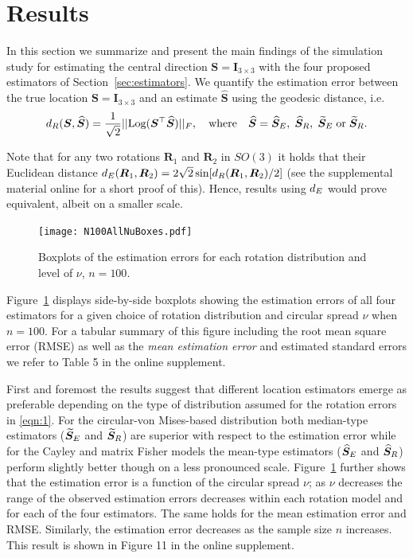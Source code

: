 \section{Results}\label{sec:results}

In this section we summarize and present the main findings of the simulation study for  estimating the central direction $\bm S = \bm I_{3\times 3}$ with the four proposed estimators of Section~\ref{sec:estimators}. We quantify the estimation error between the true location $\bm S = \bm I_{3\times 3}$ and an estimate $\widehat{\bm S}$ using the geodesic distance, i.e.
\begin{equation}
{d_R}(\bm{S}, \widehat{\bm{S}}) =  \frac{1}{\sqrt{2}}||
\text{Log}(\bm{S}^\top\widehat{\bm{S}})||_F, \quad \mbox{where} \quad \widehat{\bm{S}} =  {\widehat{\bm S}_E}, \; {\widehat{\bm S}_R},\;  {\widetilde{\bm S}_E} \; \mbox{or} \; {\widetilde{\bm S}_R}.
\end{equation}

Note that for any two rotations $\bm R_1$ and $\bm R_2$ in $SO(3)$ it holds that their Euclidean distance ${d_E}(\bm R_1,\bm R_2)=2\sqrt{2}\sin[{d_R}(\bm R_1,\bm R_2)/2]$ (see the supplemental material online for a short proof of this).  Hence, results using ${d_E}$ would prove equivalent, albeit on a smaller scale.   
\begin{figure}[h!]
\centering
\texttt{[image: N100AllNuBoxes.pdf]}
\caption{Boxplots of the estimation errors for each rotation distribution and level of $\nu$,  $n=100$.}
\label{fig:NuBoxes}
\end{figure}
Figure~\ref{fig:NuBoxes} displays side-by-side boxplots showing the estimation errors of all four estimators for a given choice of rotation distribution and circular spread $\nu$ when  $n=100$.   For a tabular summary of this figure including the root mean square error (RMSE)  as well as the \textit{mean estimation error} and estimated standard errors we refer to Table 5 in the online supplement. 

First and foremost the results suggest that different location estimators emerge as preferable depending on the type of distribution assumed for the rotation errors in \eqref{eqn:1}.  For the circular-von Mises-based distribution both median-type estimators (${\widetilde{\bm S}_E}$ and ${\widetilde{\bm S}_R}$) are superior with respect to the estimation error while for the Cayley and matrix Fisher models the mean-type estimators (${\widehat{\bm S}_E}$ and ${\widehat{\bm S}_R}$) perform slightly better though on a less pronounced scale.   Figure~\ref{fig:NuBoxes} further shows that the estimation error is a function of the circular spread $\nu$; as $\nu$ decreases the range of the observed estimation errors decreases within each rotation model and for each of the four estimators. The same holds for the mean estimation error and RMSE.  Similarly, the estimation error decreases as the sample size $n$ increases. This result is shown in Figure 11 in the online supplement.

